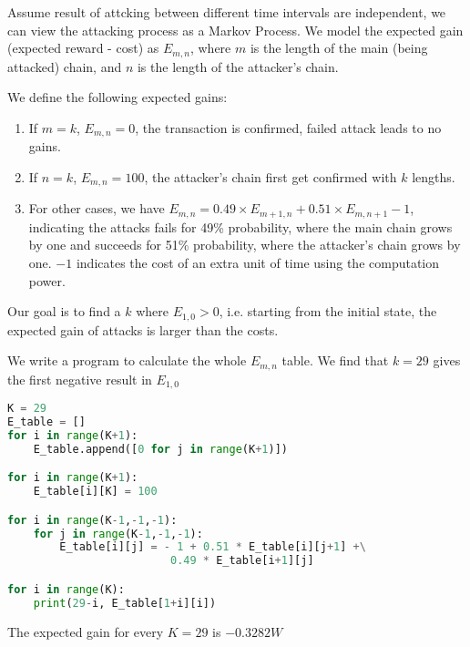 \documentclass{oxmathproblems}
\begin{document}
\vspace{-15mm}

Assume result of attcking between different time intervals are independent, we can view the attacking process as a Markov Process. We model the expected gain (expected reward - cost) as $E_{m,n}$, where $m$ is the length of the main (being attacked) chain, and $n$ is the length of the attacker's chain.

We define the following expected gains:
\begin{enumerate}
    \item If $m=k$, $E_{m,n}=0$, the transaction is confirmed, failed attack leads to no gains.
    \item If $n=k$, $E_{m,n}=100$, the attacker's chain first get confirmed with $k$ lengths.
    \item For other cases, we have $E_{m,n} = 0.49 \times E_{m+1,n} + 0.51 \times E_{m,n+1} - 1$, indicating the attacks fails for 49\% probability, where the main chain grows by one and succeeds for 51\% probability, where the attacker's chain grows by one. $-1$ indicates the cost of an extra unit of time using the computation power.
\end{enumerate}


Our goal is to find a $k$ where $E_{1,0} > 0$, i.e. starting from the initial state, the expected gain of attacks is larger than the costs.

We write a program to calculate the whole $E_{m,n}$ table. We find that $k=29$ gives the first negative result in $E_{1,0}$

\begin{lstlisting}[language=Python]
K = 29
E_table = []
for i in range(K+1):
    E_table.append([0 for j in range(K+1)])

for i in range(K+1):
    E_table[i][K] = 100

for i in range(K-1,-1,-1):
    for j in range(K-1,-1,-1):
        E_table[i][j] = - 1 + 0.51 * E_table[i][j+1] +\
                         0.49 * E_table[i+1][j]

for i in range(K):
    print(29-i, E_table[1+i][i])
\end{lstlisting}

The expected gain for every $K= 29$ is $-0.3282 W$
\end{document}
